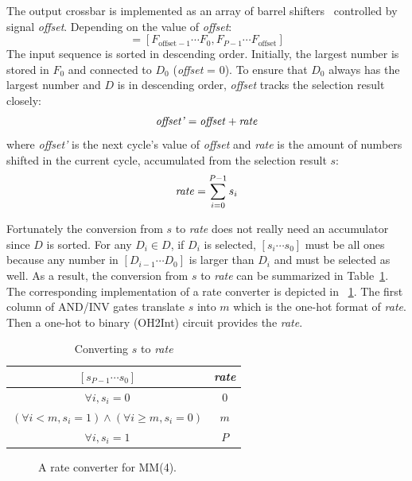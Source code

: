 \documentclass[10pt, conference]{IEEEtran}
\begin{document}
The output crossbar is implemented as an array of barrel shifters~\cite{Gigliotti2004} controlled by signal \emph{offset}. Depending on the value of \emph{offset}:
\begin{equation}
[D_{P-1} \cdots D_0] = [F_{\text{offset}-1} \cdots F_{0}, F_{P-1} \cdots F_{\text{offset}} ]
\end{equation}
The input sequence is sorted in descending order.
Initially, the largest number is stored in $F_0$ and connected to $D_0$ (\emph{offset} = 0).
To ensure that $D_0$ always has the largest number and $D$ is in descending order,
\emph{offset} tracks the selection result closely:
\begin{equation}
  \text{\emph{offset'}} = \text{\emph{offset}} + \text{\emph{rate}}
\end{equation}
where \emph{offset'} is the next cycle's value of \emph{offset} and \emph{rate} is the amount of numbers shifted in the current cycle, accumulated from the selection result $s$:
\begin{equation}
  \text{\emph{rate}} = \sum\limits_{i=0}^{P-1} s_i
\end{equation}

Fortunately the conversion from $s$ to \emph{rate} does not really need an accumulator since $D$ is sorted.
For any $D_i \in D$, if $D_i$ is selected, $[s_i \cdots s_0]$ must be all ones
because any number in $[D_{i-1} \cdots D_0]$ is larger than $D_i$ and must be selected as well.
As a result, the conversion from $s$ to \emph{rate} can be summarized in Table~\ref{tab_conv}.
The corresponding implementation of a rate converter is depicted in \figurename~\ref{fig_rate_conv}.
The first column of AND/INV gates translate $s$ into $m$ which is the one-hot format of \emph{rate}.
Then a one-hot to binary (OH2Int) circuit provides the \emph{rate}.

\begin{table}
\caption{Converting $s$ to \emph{rate}}\label{tab_conv}
\centering
\begin{tabular}{cc}
\toprule
$[s_{P - 1} \cdots {s_0}]$ & \emph{rate} \\
\midrule
 $\forall i, {s_i} = 0$ & 0 \\
 $(\forall i < m, {s_i} = 1) \wedge (\forall i \ge m, {s_i} = 0)$ & $m$ \\
 $\forall i, {s_i} = 1$  & $P$ \\
\bottomrule
\end{tabular}
\end{table}

\begin{figure}[bt]
\caption{A rate converter for MM(4).}\label{fig_rate_conv}
\end{figure}
\end{document}
